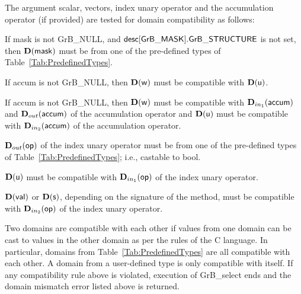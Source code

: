 The argument scalar, vectors, index unary operator and the accumulation 
operator (if provided) are tested for domain compatibility as follows:
\begin{enumerate}
    \item If {\sf mask} is not {\sf GrB\_NULL}, and ${\sf desc[GrB\_MASK].GrB\_STRUCTURE}$
    is not set, then $\bold{D}({\sf mask})$ must be from one of the pre-defined types of 
    Table~\ref{Tab:PredefinedTypes}.

    \item If {\sf accum} is not {\sf GrB\_NULL}, then $\bold{D}({\sf w})$ must be 
	compatible with $\bold{D}({\sf u})$.

    \item If {\sf accum} is not {\sf GrB\_NULL}, then $\bold{D}({\sf w})$ must be
    compatible with $\mbox{$\mathbf{D}_{in_{1}}$}({\sf accum})$ and $\mbox{$\mathbf{D}_{out}$}({\sf accum})$ of the accumulation operator and 
    $\bold{D}({\sf u})$ must be compatible with $\mbox{$\mathbf{D}_{in_{2}}$}({\sf accum})$ of the accumulation operator.

	\item $\mbox{$\mathbf{D}_{out}$}({\sf op})$ of the index unary operator must be from one of the pre-defined types of 
    Table~\ref{Tab:PredefinedTypes}; i.e., castable to {\sf bool}.

    \item $\bold{D}({\sf u})$ must be compatible with $\mbox{$\mathbf{D}_{in_{1}}$}({\sf op})$ of the index unary operator.
    
{\color{red}
    \item $\bold{D}({\sf val})$ or $\bold{D}({\sf s})$, depending on the signature of the method,
    must be compatible with $\mbox{$\mathbf{D}_{in_{2}}$}({\sf op})$ of the index unary operator.
}
\end{enumerate}

Two domains are compatible with each other if values from one domain can be cast 
to values in the other domain as per the rules of the C language.
In particular, domains from Table~\ref{Tab:PredefinedTypes} are all compatible 
with each other. A domain from a user-defined type is only compatible with itself.
If any compatibility rule above is violated, execution of {\sf GrB\_select} ends
and the domain mismatch error listed above is returned.

